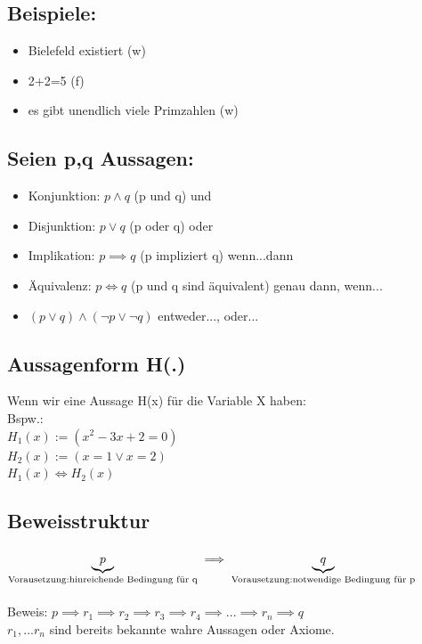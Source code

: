 \documentclass{article}
\begin{document}
       \subsection*{Beispiele:}
            \begin{itemize}
                \item Bielefeld existiert (w)
                \item 2+2=5 (f)
                \item es gibt unendlich viele Primzahlen (w)
            \end{itemize}

       \subsection*{Seien p,q Aussagen:}
            \begin{itemize}
                \item Konjunktion: $p \land q$ (p und q) \glqq und\grqq{}
                \item Disjunktion: $p\lor q$ (p oder q) \glqq oder\grqq{}
                \item Implikation: $p \implies q$ (p impliziert q) \glqq wenn...dann\grqq{}
                \item Äquivalenz: $p\iff q$ (p und q sind äquivalent) \glqq genau dann, wenn...\grqq{}
                \item $(p \lor q)\land (\lnot p\lor \lnot q)$ \glqq entweder..., oder...\grqq{}
            \end{itemize}

        \subsection*{Aussagenform H(.)}
            Wenn wir eine Aussage H(x) für die Variable X haben:\\
            Bspw.:\\
            $H_1(x):=(x^2-3x+2=0)$\\
            $H_2(x):=(x=1\lor x=2)$\\
            $H_1(x)\iff H_2(x)$
        
        \subsection*{Beweisstruktur}
            $\underbrace{p}_{\text{Vorausetzung:\\ hinreichende Bedingung für q}}\implies \underbrace{q}_{\text{Vorausetzung:\\ notwendige Bedingung für p}}$\\\\
            Beweis: $p \implies r_1\implies r_2\implies r_3\implies r_4\implies ... \implies r_n\implies q$\\
            $r_1, ... r_n$ sind bereits bekannte wahre Aussagen oder Axiome.
        
\end{document}
